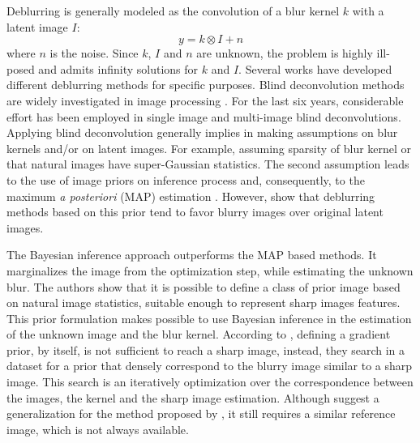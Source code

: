 \documentclass[conference,compsoc]{IEEEtran}
\begin{document}
Deblurring is generally modeled as the convolution of a blur kernel $k$
with a latent image $I$: 
\begin{equation}
 y = k \otimes I + n
 \label{eq:deblurr}
\end{equation}
where $n$ is the noise. Since $k$, $I$ and $n$ are unknown, the problem 
is highly ill-posed and admits infinity solutions for $k$ and $I$.
Several works have developed different deblurring methods for specific purposes.
Blind deconvolution methods are widely investigated in image processing \cite{bishop}.
For the last six years, considerable effort has been employed in single image
\cite{babacan,Krishnan2015,Levin2011,Zhang2011} and multi-image \cite{sroubek2012,Zhu2012} blind deconvolutions. 
Applying blind deconvolution generally implies in making assumptions on
blur kernels and/or on latent images. For example, assuming sparsity of blur kernel
or that natural images have super-Gaussian statistics. The second assumption
leads to the use of image priors on inference process and, consequently, to the maximum \textit{a posteriori}
(MAP) estimation \cite{babacan}. However, \cite{Levin} show that deblurring methods
based on this prior tend to favor blurry images over original latent images.

The Bayesian inference approach \cite{Levin} outperforms the MAP based methods. It marginalizes
the image from the optimization step, while estimating the unknown blur.
The authors show that it is possible to define a class of prior image
based on natural image statistics, suitable enough to represent sharp images features.
This prior formulation makes possible to use Bayesian inference in the estimation of the
unknown image and the blur kernel. According to \cite{Hacohen13}, defining a gradient
prior, by itself, is not sufficient to reach a sharp image, instead,
they search in a dataset for a prior that densely correspond to
the blurry image similar to a sharp image. This search is an
iteratively optimization over the correspondence between the images, the kernel and
the sharp image estimation. Although \cite{Pan2014} suggest a generalization
for the method proposed by \cite{Hacohen13}, it still requires a similar reference image,
which is not always available.
\end{document}
